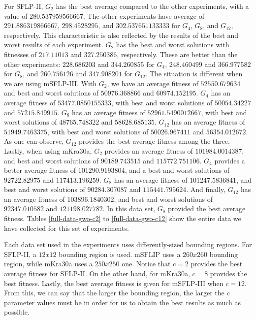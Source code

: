 For SFLP-II, $G_{2}$ has the best average compared to the other experiments, with a value of $280.537959566667$. The other experiments have average of $291.886319866667$, $298.4528295$, and $302.537651133333$ for $G_{4}$, $G_{8}$, and $G_{12}$, respectively. This characteristic is also reflected by the results of the best and worst results of each experiment. $G_{2}$ has the best and worst solutions with fitnesses of $217.11013$ and $327.250386$, respectively. These are better than the other experiments: $228.686203$ and $344.260855$ for $G_{4}$, $248.460499$ and $366.977582$ for $G_{8}$, and $260.756126$ and $347.908201$ for $G_{12}$. The situation is different when we are using mSFLP-III. With $G_{2}$, we have an average fitness of $52550.679634$ and best and worst solutions of $50976.368866$ and $60974.152195$. $G_{4}$ has an average fitness of $53477.0850155333$, with best and worst solutions of $50054.34227$ and $57215.849915$. $G_{8}$ has an average fitness of $52961.5490012667$, with best and worst solutions of $48765.748322$ and $58628.685135$. $G_{12}$ has an average fitness of $51949.7463375$, with best and worst solutions of $50026.967411$ and $56354.012672$. As one can observe, $G_{12}$ provides the best average fitness among the three. Lastly, when using mKra30a, $G_{2}$ provides an average fitness of $101984.0014387$, and best and worst solutions of $90189.743515$ and $115772.751106$. $G_{4}$ provides a better average fitness of $101290.9193804$, and a best and worst solutions of $92722.82975$ and $117413.196259$. $G_{8}$ has an average fitness of $101247.5836841$, and best and worst solutions of $90284.307087$ and $115441.795624$. And finally, $G_{12}$ has an average fitness of $103896.1840302$, and best and worst solutions of $92347.010582$ and $121198.027782$. In this data set, $G_{8}$ provided the best average fitness. Tables \ref{full-data-gwo-c2} to \ref{full-data-gwo-c12} show the entire data we have collected for this set of experiments.

Each data set used in the experiments uses differently-sized bounding regions. For SFLP-II, a $12x12$ bounding region is used. mSFLIP uses a $260x260$ bounding region, while mKra30a uses a $250x250$ one. Notice that $c = 2$ provides the best average fitness for SFLP-II. On the other hand, for mKra30a, $c = 8$ provides the best fitness. Lastly, the best average fitness is given for mSFLP-III when $c = 12$. From this, we can say that the larger the bounding region, the larger the $c$ parameter values must be in order for us to obtain the best results as much as possible. %

